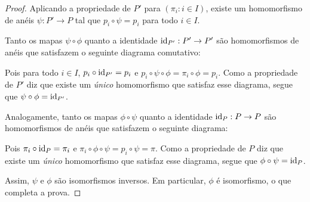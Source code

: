 \begin{proof}
    Aplicando a propriedade de $P'$ para $(\pi_i: i \in I)$, existe um homomorfismo de anéis $\psi: P'\rightarrow P$ tal que $p_i\circ \psi=p_i$ para todo $i \in I$.

    \begin{figure}[H]
        \centering
    \end{figure}

    Tanto os mapas $\psi\circ \phi$ quanto a identidade $\operatorname{id}_{P'}:P'\rightarrow P'$ são homomorfismos de anéis que satisfazem o seguinte diagrama comutativo:

    \begin{figure}[H]
        \centering
    \end{figure}

    Pois para todo $i \in I$, $p_i\circ \operatorname{id}_{P'}= p_i$ e $p_i\circ \psi\circ\phi=\pi_i\circ \phi=p_i$.
    Como a propriedade de $P'$ diz que existe um \emph{único} homomorfismo que satisfaz esse diagrama, segue que $\psi\circ \phi=\operatorname{id}_{P'}$.

    Analogamente, tanto os mapas $\phi\circ \psi$ quanto a identidade $\operatorname{id}_{P}:P\rightarrow P$ são homomorfismos de anéis que satisfazem o seguinte diagrama:
    \begin{figure}[H]
        \centering
    \end{figure}

    Pois $\pi_i\circ \operatorname{id}_{P}=\pi_i$ e $\pi_i\circ \phi\circ\psi=p_i\circ \psi=\pi$.
    Como a propriedade de $P$ diz que existe um \emph{único} homomorfismo que satisfaz esse diagrama, segue que $\phi\circ \psi=\operatorname{id}_{P}$.
    
    Assim, $\psi$ e $\phi$ são isomorfismos inversos.
    Em particular, $\phi$ é isomorfismo, o que completa a prova.
\end{proof}

